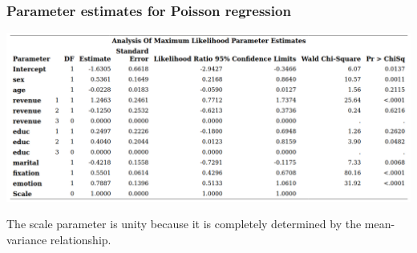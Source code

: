 \documentclass{beamer}
\begin{document}
\begin{frame}[fragile]
\frametitle{Parameter estimates for Poisson regression}
\begin{center}
\includegraphics[width = 0.99\linewidth]{img/c4/slides8-e5}
\end{center}
{\footnotesize
The scale parameter is unity because it is completely determined by the mean-variance relationship.

}
\end{frame}
\end{document}
